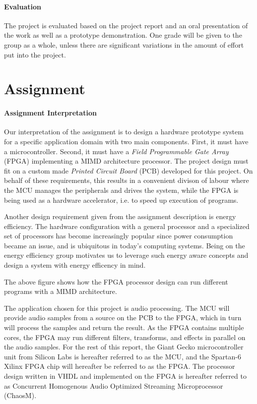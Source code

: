 \paragraph{Evaluation}
The project is evaluated based on the project report and an oral presentation of
the work as well as a prototype demonstration. One grade will be given to the
group as a whole, unless there are significant variations in the amount of
effort put into the project.

\section{Assignment}

\paragraph{Assignment Interpretation}\label{intro:our-assignment-interpretation}
Our interpretation of the assignment is to design a hardware prototype system for a
specific application domain with two main components. First, it must have a
microcontroller. Second, it must have a \textit{Field Programmable Gate Array} (FPGA)
implementing a MIMD architecture processor. The project design must fit on a custom
made \textit{Printed Circuit Board} (PCB) developed for this project. On behalf of these
requirements, this results in a convenient divison of labour where the MCU manages
the peripherals and drives the system, while the FPGA is being used as a hardware
accelerator, i.e. to speed up execution of programs.

Another design requirement given from the assignment description is energy
efficiency. The hardware configuration with a general processor and a
specialized set of processors has become increasingly popular since power
consumption became an issue, and is ubiquitous in today's computing systems.
Being on the energy efficiency group motivates us to leverage such energy aware
concepts and design a system with energy efficency in mind.


The above figure shows how the FPGA processor
design can run different programs with a MIMD architecture.

The application chosen for this project is audio processing. The MCU will
provide audio samples from a source on the PCB to the FPGA, which in turn will
process the samples and return the result. As the FPGA contains multiple cores,
the FPGA may run different filters, transforms, and effects in parallel on the
audio samples. For the rest of this report, the Giant Gecko microcontroller unit
from Silicon Labs is hereafter referred to as the MCU, and the Spartan-6 Xilinx
FPGA chip will hereafter be referred to as the FPGA. The processor design
written in VHDL and implemented on the FPGA is hereafter referred to as
Concurrent Homogenous Audio Optimized Streaming Microprocessor (ChaosM).

